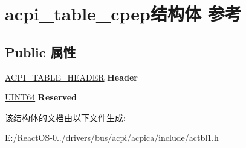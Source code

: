 \hypertarget{structacpi__table__cpep}{}\section{acpi\+\_\+table\+\_\+cpep结构体 参考}
\label{structacpi__table__cpep}
\subsection*{Public 属性}
\begin{DoxyCompactItemize}
\item 
\mbox{\label{structacpi__table__cpep_a2483c03415d6ec08603ad14ccdecad0a}} 
\hyperlink{structacpi__table__header}{A\+C\+P\+I\+\_\+\+T\+A\+B\+L\+E\+\_\+\+H\+E\+A\+D\+ER} {\bfseries Header}
\item 
\mbox{\label{structacpi__table__cpep_a99ab220f279b9ce9e0750e296d529f5a}} 
\hyperlink{_processor_bind_8h_a57be03562867144161c1bfee95ca8f7c}{U\+I\+N\+T64} {\bfseries Reserved}
\end{DoxyCompactItemize}


该结构体的文档由以下文件生成\+:\begin{DoxyCompactItemize}
\item 
E\+:/\+React\+O\+S-\/0../drivers/bus/acpi/acpica/include/actbl1.\+h\end{DoxyCompactItemize}
